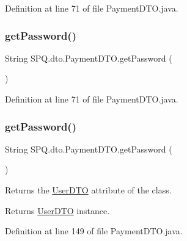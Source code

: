 Definition at line 71 of file Payment\+D\+T\+O.\+java.

\mbox{\label{class_s_p_q_1_1dto_1_1_payment_d_t_o_ae012449dd0baea7f169bb64dcf973dec}} 
\subsubsection{\texorpdfstring{get\+Password()}{getPassword()}\hspace{0.1cm}{\footnotesize\ttfamily [2/3]}}
{\footnotesize\ttfamily String S\+P\+Q.\+dto.\+Payment\+D\+T\+O.\+get\+Password (\begin{DoxyParamCaption}{ }\end{DoxyParamCaption})}



Definition at line 71 of file Payment\+D\+T\+O.\+java.

\mbox{\label{class_s_p_q_1_1dto_1_1_payment_d_t_o_ae012449dd0baea7f169bb64dcf973dec}} 
\subsubsection{\texorpdfstring{get\+Password()}{getPassword()}\hspace{0.1cm}{\footnotesize\ttfamily [3/3]}}
{\footnotesize\ttfamily String S\+P\+Q.\+dto.\+Payment\+D\+T\+O.\+get\+Password (\begin{DoxyParamCaption}{ }\end{DoxyParamCaption})}

Returns the \mbox{\hyperlink{class_s_p_q_1_1dto_1_1_user_d_t_o}{User\+D\+TO}} attribute of the class. \begin{DoxyReturn}{Returns}
\mbox{\hyperlink{class_s_p_q_1_1dto_1_1_user_d_t_o}{User\+D\+TO}} instance. 
\end{DoxyReturn}


Definition at line 149 of file Payment\+D\+T\+O.\+java.

